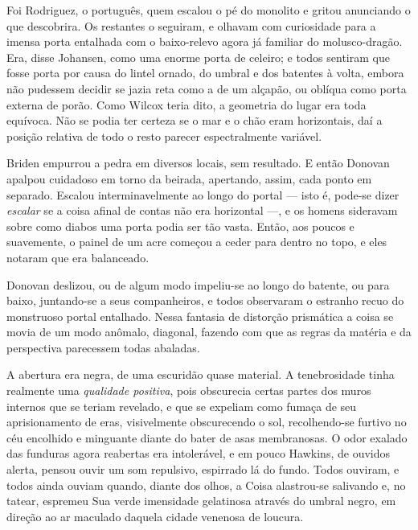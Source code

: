 Foi Rodriguez, o português, quem escalou o pé do monolito e
gritou anunciando o que descobrira. Os restantes o seguiram, e olhavam
com curiosidade para a imensa porta entalhada com o baixo-relevo agora
já familiar do molusco-dragão. Era, disse Johansen, como uma enorme
porta de celeiro; e todos sentiram que fosse porta por causa do lintel
ornado, do umbral e dos batentes à volta, embora não pudessem decidir se
jazia reta como a de um alçapão, ou oblíqua como porta externa de porão.
Como Wilcox teria dito, a geometria do lugar era toda equívoca. Não se
podia ter certeza se o mar e o chão eram horizontais, daí a posição
relativa de todo o resto parecer espectralmente variável.

Briden empurrou a pedra em diversos locais, sem resultado. E então
Donovan apalpou cuidadoso em torno da beirada, apertando, assim, cada
ponto em separado. Escalou interminavelmente ao longo do portal --- isto
é, pode-se dizer \emph{escalar} se a coisa afinal de contas não era
horizontal ---, e os homens sideravam sobre como diabos uma porta podia
ser tão vasta. Então, aos poucos e suavemente, o painel de um acre
começou a ceder para dentro no topo, e eles notaram que era balanceado.

Donovan deslizou, ou de algum modo impeliu-se ao longo do batente, ou
para baixo, juntando-se a seus companheiros, e todos observaram o
estranho recuo do monstruoso portal entalhado. Nessa fantasia de
distorção prismática a coisa se movia de um modo anômalo, diagonal,
fazendo com que as regras da matéria e da perspectiva parecessem todas
abaladas.

A abertura era negra, de uma escuridão quase material. A tenebrosidade
tinha realmente uma \emph{qualidade positiva}, pois obscurecia certas
partes dos muros internos que se teriam revelado, e que se expeliam como
fumaça de seu aprisionamento de eras, visivelmente obscurecendo o sol,
recolhendo-se furtivo no céu encolhido e minguante diante do bater de
asas membranosas. O odor exalado das funduras agora reabertas era
intolerável, e em pouco Hawkins, de ouvidos alerta, pensou ouvir um som
repulsivo, espirrado lá do fundo. Todos ouviram, e todos ainda ouviam
quando, diante dos olhos, a Coisa alastrou-se salivando e, no tatear,
espremeu Sua verde imensidade gelatinosa através do umbral negro, em
direção ao ar maculado daquela cidade venenosa de loucura.

